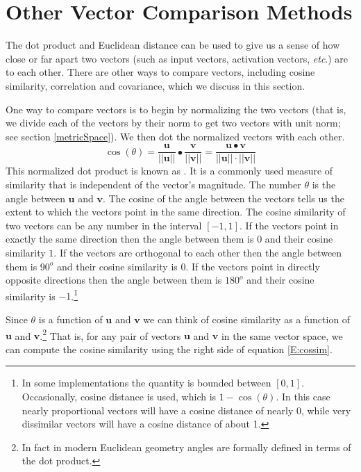 \section{Other Vector Comparison Methods}\label{vector_comparisons}

The dot product and Euclidean distance can be used to give us a sense of
how close or far apart two vectors (such as input vectors, activation vectors, 
\emph{etc}.) are to each other. There are other ways to compare vectors, including cosine similarity,
correlation and covariance, which we discuss in this section.

   One way to compare vectors is to begin by normalizing the two vectors (that is, we divide each
of the vectors by their norm to get two vectors with unit norm; see 
section \ref{metricSpace}). We then dot the normalized vectors with each 
other.
\begin{equation}\label{E:cossim}
\cos(\theta) = 
\frac{\mathbf{u}}{|| \mathbf{u}||}  \bullet 
\frac{\mathbf{v}}{|| \mathbf{v}||} =
\frac{\mathbf{u} \bullet \mathbf{v}}{|| \mathbf{u}||  \cdot 
||\mathbf{v}||}
\end{equation}
This normalized dot product is known as . It is a 
commonly used measure of similarity that is independent of the vector's 
magnitude. The number $\theta$ is the angle between $\mathbf{u}$ and 
$\mathbf{v}$. The cosine of the angle between the vectors tells us the extent 
to which the vectors point in the same direction. The cosine similarity of two 
vectors can be any number in the interval $[-1, 1]$. If the vectors point in 
exactly the same direction then the angle between them is $0$ and their cosine 
similarity $1$. If the vectors are orthogonal to each other then the angle 
between them is $90^o$ and their cosine similarity is $0$. If the vectors 
point in directly opposite directions then the angle between them is $180^o$ 
and their cosine similarity is $-1$.\footnote{In some implementations the
quantity is bounded between $[0,1]$. Occasionally, cosine distance is used, 
which is $1 - \cos(\theta)$. In this case nearly proportional vectors 
will have a cosine distance of nearly 0, while very dissimilar vectors will 
have a cosine distance of about 1.}

Since $\theta$ is a function of  $\mathbf{u}$ and  $\mathbf{v}$ 
we can think of cosine similarity as a function of  $\mathbf{u}$ and  $\mathbf{v}$.\footnote{In fact in modern Euclidean geometry 
angles are formally defined in terms of the dot product.}  
That is, for any pair of vectors $\mathbf{u}$ and  $\mathbf{v}$ in the same vector space, we can compute the cosine similarity 
using the right side of equation \eqref{E:cossim}.

